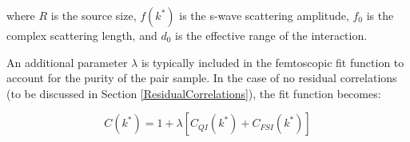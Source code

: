 \documentclass[../AnalysisNoteJBuxton.tex]{subfiles}
\begin{document}
where $R$ is the source size, $f(k^{*})$ is the s-wave scattering amplitude, $f_{0}$ is the complex scattering length, and $d_{0}$ is the effective range of the interaction.

An additional parameter $\lambda$ is typically included in the femtoscopic fit function to account for the purity of the pair sample.  In the case of no residual correlations (to be discussed in Section \ref{ResidualCorrelations}), the fit function becomes:

\begin{equation}
 C(k^{*}) = 1 + \lambda[C_{QI}(k^{*}) + C_{FSI}(k^{*})]
\label{eqn:LednickyEqnwLambda}
\end{equation}
\end{document}
